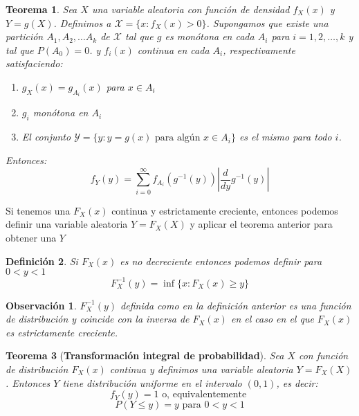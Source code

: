 \documentclass[14pt]{extarticle}
\newtheorem{theorem}{Teorema}[section]
\newtheorem{definition}[theorem]{Definición}
\newtheorem{remark}{Observación}[section]
\begin{document}
\begin{theorem}
    Sea $X$ una variable aleatoria con función de densidad $f_X(x)$ y $Y = g(X)$. Definimos a $\mathcal{X}=\{x: f_X(x) > 0\}$.
    Supongamos que existe una partición $A_1, A_2, \ldots A_k$ de $\mathcal{X}$ tal que $g$ es monótona en cada $A_i$ para $i=1,2,\ldots, k$ y tal que $P(A_0) = 0$.
    y $f_i(x)$ continua en cada $A_i$, respectivamente satisfaciendo:
    \begin{enumerate}
        \item $g_X(x) = g_{A_i}(x)$ para $x \in A_i$
        \item $g_i$ monótona en $A_i$
        \item El conjunto $\mathcal{Y}=\{y: y = g(x) \text{ para algún } x \in A_i\}$ es el mismo para todo $i$.
    \end{enumerate}
    Entonces:
    \[
        f_Y(y) = \sum_{i=0}^\infty f_{A_i}(g^{-1}(y)) \left| \frac{d}{dy} g^{-1}(y) \right|
    \]
\end{theorem}

Si tenemos una $F_X(x)$ continua y estrictamente creciente, entonces podemos definir una variable aleatoria $Y = F_X(X)$ y aplicar el teorema anterior para obtener una $Y$

\begin{definition}
    Si $F_X(x)$ es no decreciente entonces podemos definir para $0<y<1$
    $$F_X^{-1}(y) = \inf \{x: F_X(x) \geq y\}$$
\end{definition}

\begin{remark}
    $F_X^{-1}(y)$ definida como en la definición anterior es una función de distribución y coincide con la inversa de $F_X(x)$ en el caso en el que $F_X(x)$ es estrictamente creciente.
\end{remark}


\begin{theorem}[\textbf{Transformación integral de probabilidad}]
    Sea $X$ con función de distribución $F_X(x)$ continua y definimos una variable aleatoria $Y = F_X(X)$. Entonces $Y$ tiene distribución uniforme en el
     intervalo $(0,1)$, es decir:
     $$f_Y(y) = 1 \text{ o, equivalentemente }$$
     $$P(Y \leq y) = y \text{ para } 0 < y < 1$$
\end{theorem}



\end{document}
